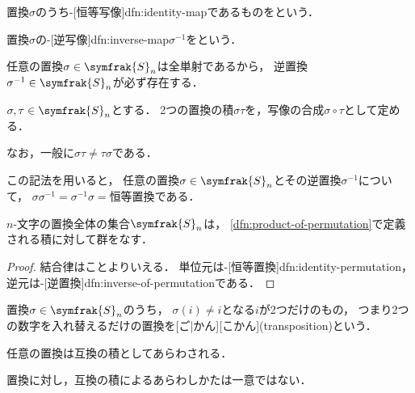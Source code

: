 \documentclass[../sotsu.tex]{subfiles}
\begin{document}
\begin{definition}
    \label{dfn:identity-permutation}
    置換$\sigma$のうち-[恒等写像]{dfn:identity-map}であるものをという．   
\end{definition}

\begin{definition}
    \label{dfn:inverse-of-permutation}
    置換$\sigma$の-[逆写像]{dfn:inverse-map}$\sigma^{-1}$をという．
\end{definition}

任意の置換$\sigma \in \symfrak{S}_n$は全単射であるから，
逆置換$\sigma^{-1} \in \symfrak{S}_n$が必ず存在する．

\begin{definition}[置換の積]
    \label{dfn:product-of-permutation}
    $\sigma, \tau \in \symfrak{S}_n$とする．
    2つの置換の積$\sigma\tau$を，写像の合成$\sigma \circ \tau$として定める．
\end{definition}

なお，一般に$\sigma \tau \neq \tau \sigma$である．

この記法を用いると，
任意の置換$\sigma \in \symfrak{S}_n$とその逆置換$\sigma^{-1}$について，
$\sigma \sigma^{-1} = \sigma^{-1} \sigma = \text{恒等置換}$である．

\begin{proposition}
    $n$-文字の置換全体の集合$\symfrak{S}_n$は，
    \cref{dfn:product-of-permutation}で定義される積に対して群をなす．
\end{proposition}

\begin{proof}
    結合律はことよりいえる．
    単位元は-[恒等置換]{dfn:identity-permutation}，
    逆元は-[逆置換]{dfn:inverse-of-permutation}である．
\end{proof}

\begin{definition}
    \label{dfn:transposition}
    置換$\sigma \in \symfrak{S}_n$のうち，
    $\sigma(i) \neq i$となる$i$が2つだけのもの，
    つまり2つの数字を入れ替えるだけの置換を[ご|かん][こかん](transposition)という．
\end{definition}

\begin{proposition}
    任意の置換は互換の積としてあらわされる．
\end{proposition}

置換に対し，互換の積によるあらわしかたは一意ではない．
\end{document}
